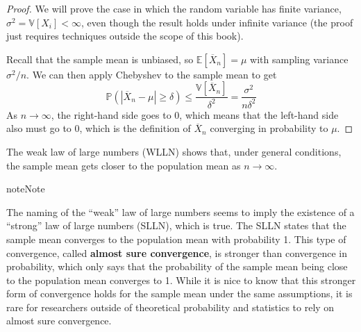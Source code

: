 \documentclass[
  13pt,
  letterpaper,
  DIV=11,
  numbers=noendperiod]{scrreprt}
\newcommand{\E}{\mathbb{E}}
\newcommand{\V}{\mathbb{V}}
\renewcommand{\P}{\mathbb{P}}
\newcommand{\Xbar}{\overline{X}}
\theoremstyle{plain}
\theoremstyle{plain}
\theoremstyle{definition}
\theoremstyle{definition}
\theoremstyle{remark}
\begin{document}
\begin{proof}
We will prove the case in which the random variable has finite variance,
\(\sigma^2 = \V[X_i] < \infty\), even though the result holds under
infinite variance (the proof just requires techniques outside the scope
of this book).

Recall that the sample mean is unbiased, so \(\E[\Xbar_n] = \mu\) with
sampling variance \(\sigma^2/n\). We can then apply Chebyshev to the
sample mean to get \[
\P(|\Xbar_n - \mu| \geq \delta) \leq \frac{\V[\Xbar_n]}{\delta^2} = \frac{\sigma^2}{n\delta^2}
\] As \(n\rightarrow\infty\), the right-hand side goes to 0, which means
that the left-hand side also must go to 0, which is the definition of
\(\Xbar_n\) converging in probability to \(\mu\).
\end{proof}

The weak law of large numbers (WLLN) shows that, under general
conditions, the sample mean gets closer to the population mean as
\(n\rightarrow\infty\).

\begin{bookcallout}{note}{Note}

The naming of the ``weak'' law of large numbers seems to imply the
existence of a ``strong'' law of large numbers (SLLN), which is true.
The SLLN states that the sample mean converges to the population mean
with probability 1. This type of convergence, called \textbf{almost sure
convergence}, is stronger than convergence in probability, which only
says that the probability of the sample mean being close to the
population mean converges to 1. While it is nice to know that this
stronger form of convergence holds for the sample mean under the same
assumptions, it is rare for researchers outside of theoretical
probability and statistics to rely on almost sure convergence.

\end{bookcallout}
\end{document}
